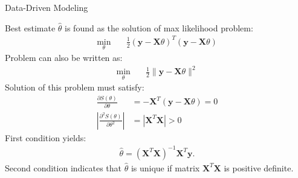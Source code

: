 \documentclass[9pt]{beamer}
\begin{document}
%
\begin{frame}{Data-Driven Modeling}

Best estimate $\hat{\theta}$ is found as the solution of max likelihood problem:
\begin{align*}
\min_{\theta}&\quad \frac{1}{2}(\mathbf{y}-\mathbf{X}\theta)^T (\mathbf{y}-\mathbf{X}\theta)
\end{align*}
Problem can also be written as:
\begin{align*}
\min_{\theta}&\quad \frac{1}{2}\|\mathbf{y}-\mathbf{X}\theta\|^2
\end{align*}
Solution of this problem must satisfy:
\begin{align*}
\frac{\partial S(\theta)}{\partial \theta} &= -\mathbf{X}^T(\mathbf{y}-\mathbf{X}\theta)=0\\
\left|\frac{\partial^2 S(\theta)}{\partial \theta^2}\right| &= \left|\mathbf{X}^T\mathbf{X}\right|>0
\end{align*}
First condition yields:
\begin{align*}
\hat{\theta}=(\mathbf{X}^T\mathbf{X})^{-1}\mathbf{X}^T\mathbf{y}.
\end{align*}
Second condition indicates that $\hat{\theta}$ is unique if matrix $\mathbf{X}^T\mathbf{X}$ is positive definite. 

\end{frame}
\end{document}
